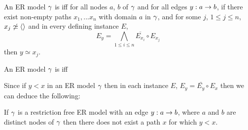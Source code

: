 \begin{definition}
An ER model $\gamma$ is  iff for all  nodes $a$, $b$ of $\gamma$ and for all edges $y: a \rightarrow b$, if there exist non-empty paths $x_1,...x_n$   with domain $a$ in $\gamma$,  and for some $j$, $1 \leq j \leq n$, $x_j \not\simeq \langle\rangle$ and in every defining instance $E$,  
$$E_y = \bigwedge_{1 \leq i \leq n}{\overline{E_{x_i}}} \circ E_{x_j}$$
then $y \simeq x_j$.  
\end{definition}

\begin{newtt}
\begin{definition}
An ER model $\gamma$ is  iff 
\end{definition}
\end{newtt}

Since if $y < x$ in an ER model $\gamma$ then in each instance $E$, $E_y = \bar{E_y} \circ E_x$
then we can deduce the following:
\begin{observation}
If $\gamma$ is a restriction free  ER model with an edge $y:a \rightarrow b$, where  $a$ and $b$ are distinct nodes of $\gamma$ then there does not exist a path  $x$ for which $y < x$.
\end{observation}

